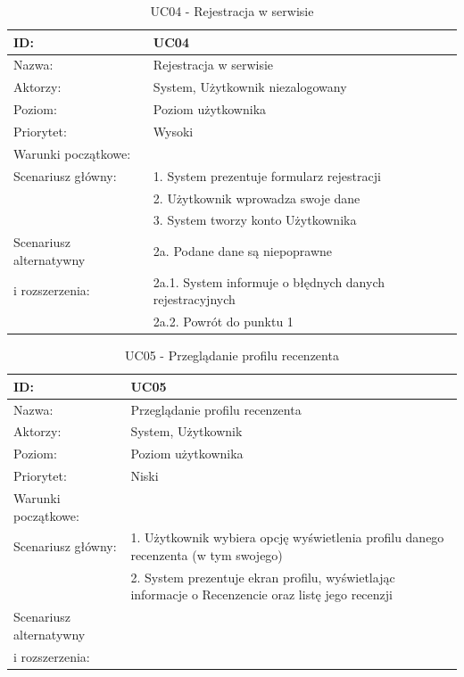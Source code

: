 \begin{table}[H]
    \begin{tabular}{|p{5cm}|p{9cm}|}\hline
    ID: & UC04 \\\hline
    Nazwa: & Rejestracja w serwisie \\\hline
    Aktorzy: & System, Użytkownik niezalogowany \\\hline
    Poziom: & Poziom użytkownika  \\\hline
    Priorytet: & Wysoki \\\hline
    Warunki początkowe: & ~ \\\hline
    Scenariusz główny: & 1. System prezentuje formularz rejestracji \\
    ~ & 2. Użytkownik wprowadza swoje dane \\
    ~ & 3. System tworzy konto Użytkownika \\\hline
    Scenariusz alternatywny & 2a. Podane dane są niepoprawne \\
    i rozszerzenia: & 2a.1. System informuje o błędnych danych rejestracyjnych \\
    ~ & 2a.2. Powrót do punktu 1 \\
    \hline\end{tabular}
	\caption{UC04 - Rejestracja w serwisie}
\end{table}
\newpage
\begin{table}[H]
    \begin{tabular}{|p{5cm}|p{9cm}|}\hline
    ID: & UC05 \\\hline
    Nazwa: & Przeglądanie profilu recenzenta \\\hline
    Aktorzy: & System, Użytkownik \\\hline
    Poziom: & Poziom użytkownika  \\\hline
    Priorytet: & Niski \\\hline
    Warunki początkowe: & ~ \\\hline
    Scenariusz główny: & 1. Użytkownik wybiera opcję wyświetlenia profilu danego recenzenta (w tym swojego) \\
    ~ & 2. System prezentuje ekran profilu, wyświetlając informacje o Recenzencie oraz listę jego recenzji \\\hline
    Scenariusz alternatywny & ~ \\
	i rozszerzenia: & ~ \\
    \hline\end{tabular}
	\caption{UC05 - Przeglądanie profilu recenzenta}
\end{table}


